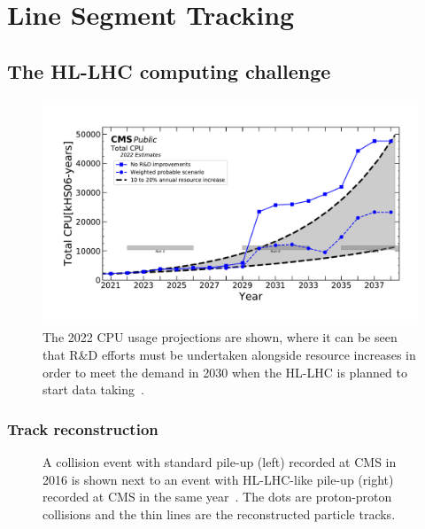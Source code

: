 \chapter{Line Segment Tracking}\label{ch:lst}

\section{The HL-LHC computing challenge}

\begin{figure}[htb]
    \centering
    \includegraphics[width=.9\textwidth]{fig/lst/cpu_cms2022.pdf}
    \caption{
        The 2022 CPU usage projections are shown, where it can be seen that R\&D efforts must be undertaken alongside resource increases in order to meet the demand in 2030 when the HL-LHC is planned to start data taking~\cite{CMSComputingReport2022}.
    }
    \label{fig:cpu_projections}
\end{figure}

\subsection{Track reconstruction}

\begin{figure}[!htb]
    \centering
    \qquad
    \caption{
        A collision event with standard pile-up (left) recorded at CMS in 2016 is shown next to an event with HL-LHC-like pile-up (right) recorded at CMS in the same year~\cite{NormalPU2016, HighPU2016}.
        The dots are proton-proton collisions and the thin lines are the reconstructed particle tracks.
    }
    \label{fig:pileup}
\end{figure}

